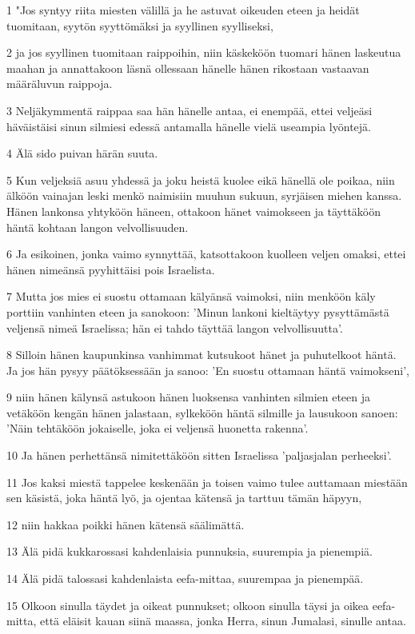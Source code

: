 \par 1 "Jos syntyy riita miesten välillä ja he astuvat oikeuden eteen ja heidät tuomitaan, syytön syyttömäksi ja syyllinen syylliseksi,
\par 2 ja jos syyllinen tuomitaan raippoihin, niin käskeköön tuomari hänen laskeutua maahan ja annattakoon läsnä ollessaan hänelle hänen rikostaan vastaavan määräluvun raippoja.
\par 3 Neljäkymmentä raippaa saa hän hänelle antaa, ei enempää, ettei veljeäsi häväistäisi sinun silmiesi edessä antamalla hänelle vielä useampia lyöntejä.
\par 4 Älä sido puivan härän suuta.
\par 5 Kun veljeksiä asuu yhdessä ja joku heistä kuolee eikä hänellä ole poikaa, niin älköön vainajan leski menkö naimisiin muuhun sukuun, syrjäisen miehen kanssa. Hänen lankonsa yhtyköön häneen, ottakoon hänet vaimokseen ja täyttäköön häntä kohtaan langon velvollisuuden.
\par 6 Ja esikoinen, jonka vaimo synnyttää, katsottakoon kuolleen veljen omaksi, ettei hänen nimeänsä pyyhittäisi pois Israelista.
\par 7 Mutta jos mies ei suostu ottamaan kälyänsä vaimoksi, niin menköön käly porttiin vanhinten eteen ja sanokoon: 'Minun lankoni kieltäytyy pysyttämästä veljensä nimeä Israelissa; hän ei tahdo täyttää langon velvollisuutta'.
\par 8 Silloin hänen kaupunkinsa vanhimmat kutsukoot hänet ja puhutelkoot häntä. Ja jos hän pysyy päätöksessään ja sanoo: 'En suostu ottamaan häntä vaimokseni',
\par 9 niin hänen kälynsä astukoon hänen luoksensa vanhinten silmien eteen ja vetäköön kengän hänen jalastaan, sylkeköön häntä silmille ja lausukoon sanoen: 'Näin tehtäköön jokaiselle, joka ei veljensä huonetta rakenna'.
\par 10 Ja hänen perhettänsä nimitettäköön sitten Israelissa 'paljasjalan perheeksi'.
\par 11 Jos kaksi miestä tappelee keskenään ja toisen vaimo tulee auttamaan miestään sen käsistä, joka häntä lyö, ja ojentaa kätensä ja tarttuu tämän häpyyn,
\par 12 niin hakkaa poikki hänen kätensä säälimättä.
\par 13 Älä pidä kukkarossasi kahdenlaisia punnuksia, suurempia ja pienempiä.
\par 14 Älä pidä talossasi kahdenlaista eefa-mittaa, suurempaa ja pienempää.
\par 15 Olkoon sinulla täydet ja oikeat punnukset; olkoon sinulla täysi ja oikea eefa-mitta, että eläisit kauan siinä maassa, jonka Herra, sinun Jumalasi, sinulle antaa.
